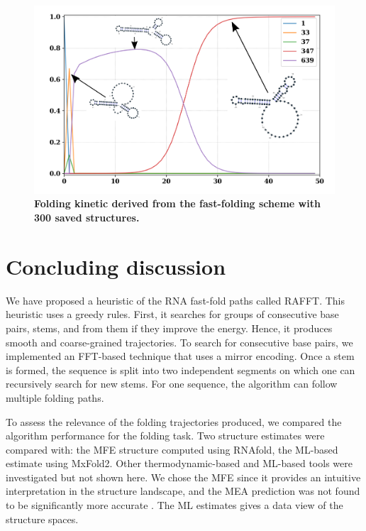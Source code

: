 \documentclass[a4paper,12pt]{article}
\begin{document}
{{\begin{figure}[h!]
\centering
\includegraphics[scale=0.85]{img/kinetic_comb.png}
\caption{\label{landscape}\textbf{Folding kinetic derived from the fast-folding scheme with 300 saved structures.}}
\end{figure}

\section*{Concluding discussion}
\label{sec:org90b93cd}
We have proposed a heuristic of the RNA fast-fold paths called RAFFT. This
heuristic uses a greedy rules. First, it searches for groups of consecutive base
pairs, stems, and from them if they improve the energy. Hence, it produces
smooth and coarse-grained trajectories. To search for consecutive base pairs, we
implemented an FFT-based technique that uses a mirror encoding. Once a stem is
formed, the sequence is split into two independent segments on which one can
recursively search for new stems. For one sequence, the algorithm can follow
multiple folding paths.

To assess the relevance of the folding trajectories produced, we compared the
algorithm performance for the folding task. Two structure estimates were
compared with: the MFE structure computed using RNAfold, the ML-based estimate
using MxFold2. Other thermodynamic-based and ML-based tools were investigated
but not shown here. We chose the MFE since it provides an intuitive
interpretation in the structure landscape, and the MEA prediction was not found
to be significantly more accurate \cite{mathews19_how_to_bench_rna_secon}. The ML
estimates gives a data view of the structure spaces.

}}
\end{document}
